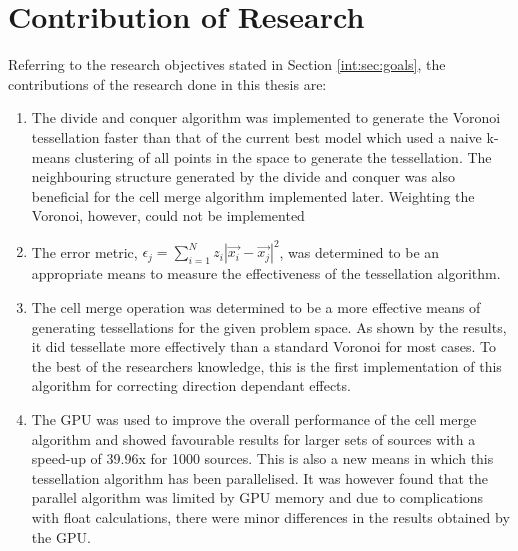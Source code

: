 \section{Contribution of Research}
Referring to the research objectives stated in Section \ref{int:sec:goals}, the contributions of the research done in this thesis are:
\begin{enumerate}
\item The divide and conquer algorithm was implemented to generate the Voronoi tessellation faster than that of the current best model which used a naive k-means clustering of all points in the space to generate the tessellation. The neighbouring structure generated by the divide and conquer was also beneficial for the cell merge algorithm implemented later. Weighting the Voronoi, however, could not be implemented
\item The error metric, $\epsilon_j = \sum^N_{i=1} z_i|\vec{x_i} - \vec{x_j}|^2$, was determined to be an appropriate means to measure the effectiveness of the tessellation algorithm.
\item The cell merge operation was determined to be a more effective means of generating tessellations for the given problem space. As shown by the results, it did tessellate more effectively than a standard Voronoi for most cases. To the best of the researchers knowledge, this is the first implementation of this algorithm for correcting direction dependant effects.
\item The GPU was used to improve the overall performance of the cell merge algorithm and showed favourable results for larger sets of sources with a speed-up of 39.96x for 1000 sources. This is also a new means in which this tessellation algorithm has been parallelised. It was however found that the parallel algorithm was limited by GPU memory and due to complications with float calculations, there were minor differences in the results obtained by the GPU.
\end{enumerate}
